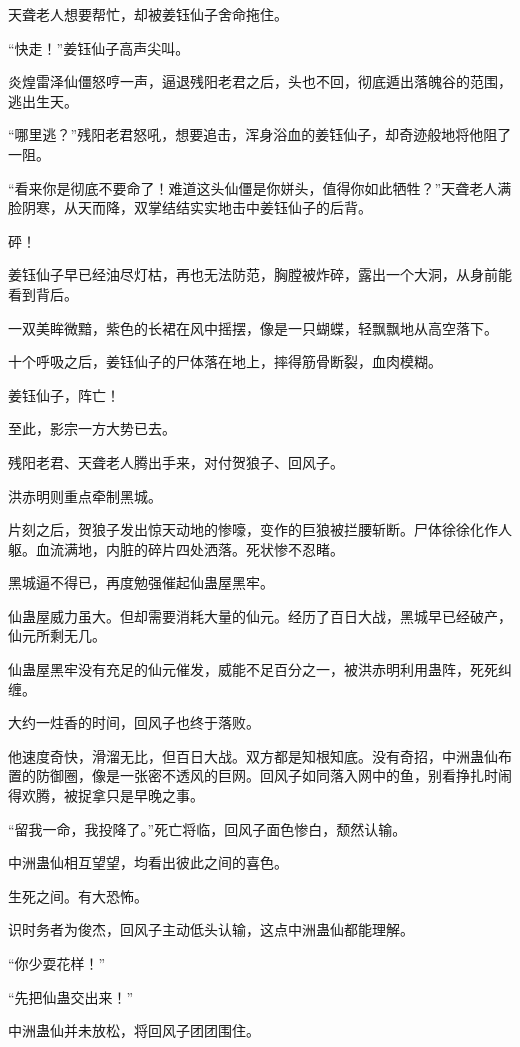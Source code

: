 \begin{this_body}
天聋老人想要帮忙，却被姜钰仙子舍命拖住。

“快走！”姜钰仙子高声尖叫。

炎煌雷泽仙僵怒哼一声，逼退残阳老君之后，头也不回，彻底遁出落魄谷的范围，逃出生天。

“哪里逃？”残阳老君怒吼，想要追击，浑身浴血的姜钰仙子，却奇迹般地将他阻了一阻。

“看来你是彻底不要命了！难道这头仙僵是你姘头，值得你如此牺牲？”天聋老人满脸阴寒，从天而降，双掌结结实实地击中姜钰仙子的后背。

砰！

姜钰仙子早已经油尽灯枯，再也无法防范，胸膛被炸碎，露出一个大洞，从身前能看到背后。

一双美眸微黯，紫色的长裙在风中摇摆，像是一只蝴蝶，轻飘飘地从高空落下。

十个呼吸之后，姜钰仙子的尸体落在地上，摔得筋骨断裂，血肉模糊。

姜钰仙子，阵亡！

至此，影宗一方大势已去。

残阳老君、天聋老人腾出手来，对付贺狼子、回风子。

洪赤明则重点牵制黑城。

片刻之后，贺狼子发出惊天动地的惨嚎，变作的巨狼被拦腰斩断。尸体徐徐化作人躯。血流满地，内脏的碎片四处洒落。死状惨不忍睹。

黑城逼不得已，再度勉强催起仙蛊屋黑牢。

仙蛊屋威力虽大。但却需要消耗大量的仙元。经历了百日大战，黑城早已经破产，仙元所剩无几。

仙蛊屋黑牢没有充足的仙元催发，威能不足百分之一，被洪赤明利用蛊阵，死死纠缠。

大约一炷香的时间，回风子也终于落败。

他速度奇快，滑溜无比，但百日大战。双方都是知根知底。没有奇招，中洲蛊仙布置的防御圈，像是一张密不透风的巨网。回风子如同落入网中的鱼，别看挣扎时闹得欢腾，被捉拿只是早晚之事。

“留我一命，我投降了。”死亡将临，回风子面色惨白，颓然认输。

中洲蛊仙相互望望，均看出彼此之间的喜色。

生死之间。有大恐怖。

识时务者为俊杰，回风子主动低头认输，这点中洲蛊仙都能理解。

“你少耍花样！”

“先把仙蛊交出来！”

中洲蛊仙并未放松，将回风子团团围住。


\end{this_body}
